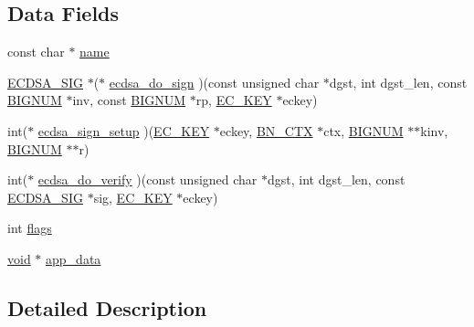 \subsection*{Data Fields}
\begin{DoxyCompactItemize}
\item 
const char $\ast$ \hyperlink{structecdsa__method_a8f8f80d37794cde9472343e4487ba3eb}{name}
\item 
\hyperlink{crypto_2ecdsa_2ecdsa_8h_a3298e5488d7e3f4a8ede239866bfc5b3}{E\+C\+D\+S\+A\+\_\+\+S\+IG} $\ast$($\ast$ \hyperlink{structecdsa__method_aa135cd0d57241f79212c805c8ceaad74}{ecdsa\+\_\+do\+\_\+sign} )(const unsigned char $\ast$dgst, int dgst\+\_\+len, const \hyperlink{crypto_2ossl__typ_8h_a6fb19728907ec6515e4bfb716bffa141}{B\+I\+G\+N\+UM} $\ast$inv, const \hyperlink{crypto_2ossl__typ_8h_a6fb19728907ec6515e4bfb716bffa141}{B\+I\+G\+N\+UM} $\ast$rp, \hyperlink{crypto_2ec_2ec_8h_a756878ae60b2fc17d4217e77ffe5e0d3}{E\+C\+\_\+\+K\+EY} $\ast$eckey)
\item 
int($\ast$ \hyperlink{structecdsa__method_a1849a5b5ecafde08839a11e236a67dc3}{ecdsa\+\_\+sign\+\_\+setup} )(\hyperlink{crypto_2ec_2ec_8h_a756878ae60b2fc17d4217e77ffe5e0d3}{E\+C\+\_\+\+K\+EY} $\ast$eckey, \hyperlink{crypto_2ossl__typ_8h_a0b235a35b7dd7922c097571ecd90e2bc}{B\+N\+\_\+\+C\+TX} $\ast$ctx, \hyperlink{crypto_2ossl__typ_8h_a6fb19728907ec6515e4bfb716bffa141}{B\+I\+G\+N\+UM} $\ast$$\ast$kinv, \hyperlink{crypto_2ossl__typ_8h_a6fb19728907ec6515e4bfb716bffa141}{B\+I\+G\+N\+UM} $\ast$$\ast$r)
\item 
int($\ast$ \hyperlink{structecdsa__method_a0a6423be97171faf0d261d54e61f0abb}{ecdsa\+\_\+do\+\_\+verify} )(const unsigned char $\ast$dgst, int dgst\+\_\+len, const \hyperlink{crypto_2ecdsa_2ecdsa_8h_a3298e5488d7e3f4a8ede239866bfc5b3}{E\+C\+D\+S\+A\+\_\+\+S\+IG} $\ast$sig, \hyperlink{crypto_2ec_2ec_8h_a756878ae60b2fc17d4217e77ffe5e0d3}{E\+C\+\_\+\+K\+EY} $\ast$eckey)
\item 
int \hyperlink{structecdsa__method_ac8bf36fe0577cba66bccda3a6f7e80a4}{flags}
\item 
\hyperlink{hw__4758__cca_8h_afad4d591c7931ff6dc5bf69c76c96aa0}{void} $\ast$ \hyperlink{structecdsa__method_a02f2e20ee9163913d729eb922b3c672a}{app\+\_\+data}
\end{DoxyCompactItemize}


\subsection{Detailed Description}


